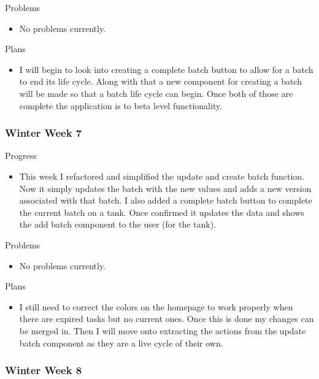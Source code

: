         \noindent
        Problems
        \begin{itemize}
            \item No problems currently.
        \end{itemize}
        
        \noindent
        Plans
        \begin{itemize}
            \item I will begin to look into creating a complete batch button to allow for a batch to end its life cycle.  Along with that a new component for creating a batch will be made so that a batch life cycle can begin.  Once both of those are complete the application is to beta level functionality.
        \end{itemize}
        
    \subsubsection{Winter Week 7}
    
        \noindent
        Progress
        \begin{itemize}
            \item This week I refactored and simplified the update and create batch function.  Now it simply updates the batch with the new values and adds a new version associated with that batch.  I also added a complete batch button to complete the current batch on a tank.  Once confirmed it updates the data and shows the add batch component to the user (for the tank).
        \end{itemize}
        
        \noindent
        Problems
        \begin{itemize}
            \item No problems currently.
        \end{itemize}
        
        \noindent
        Plans
        \begin{itemize}
            \item I still need to correct the colors on the homepage to work properly when there are expired tasks but no current ones.  Once this is done my changes can be merged in.  Then I will move onto extracting the actions from the update batch component as they are a live cycle of their own.
        \end{itemize}
        
    \subsubsection{Winter Week 8}
    

